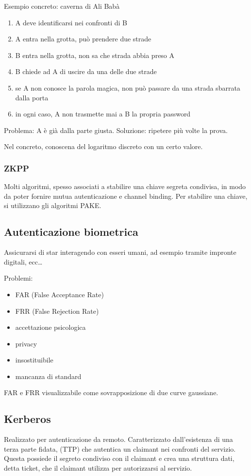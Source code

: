\documentclass[11pt]{article}
\begin{document}
Esempio concreto: caverna di Ali Babà
\begin{enumerate}
    \item A deve identificarsi nei confronti di B 
    \item A entra nella grotta, può prendere due strade 
    \item B entra nella grotta, non sa che strada abbia preso A 
    \item B chiede ad A di uscire da una delle due strade 
    \item se A non conosce la parola magica, non può passare da una strada sbarrata dalla porta 
    \item in ogni caso, A non trasmette mai a B la propria password  
\end{enumerate}
Problema: A è già dalla parte giusta. Soluzione: ripetere più volte la prova.

Nel concreto, conoscena del logaritmo discreto con un certo valore.
\subsubsection{ZKPP}
Molti algoritmi, spesso associati a stabilire una chiave segreta condivisa, in modo da poter fornire mutua autenticazione 
e channel binding. Per stabilire una chiave, si utilizzano gli algoritmi PAKE.
\subsection{Autenticazione biometrica}
Assicurarsi di star interagendo con esseri umani, ad esempio tramite impronte digitali, ecc\dots

Problemi:
\begin{itemize}
    \item FAR (False Acceptance Rate)
    \item FRR (False Rejection Rate)
    \item accettazione psicologica
    \item privacy
    \item insostituibile 
    \item mancanza di standard 
\end{itemize}
FAR e FRR visualizzabile come sovrapposizione di due curve gaussiane.
\subsection{Kerberos}
Realizzato per autenticazione da remoto. Caratterizzato dall'esistenza di una terza parte fidata, (TTP) che autentica un 
claimant nei confronti del servizio. Questa possiede il segreto condiviso con il claimant e crea una struttura dati, detta 
ticket, che il claimant utilizza per autorizzarsi al servizio. 
\end{document}
